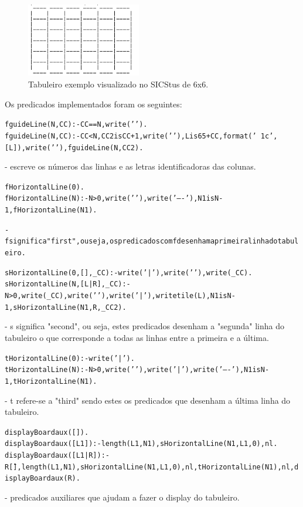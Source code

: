 \documentclass[a4paper]{article}
\begin{document}
\begin{figure}[h!]
\centering
\includegraphics[width=50mm]{board.jpg}
\caption{Tabuleiro exemplo visualizado no SICStus de 6x6. \label{board}}
\end{figure}

Os predicados implementados foram os seguintes:

\begin{alltt}
	fguideLine(N, CC) :- CC==N, write('    ').
	fguideLine(N, CC) :- CC < N, CC2 is CC+1, write('    '), \newline L is 65+CC, format('~1c', [L]) , write(' '), fguideLine(N, CC2).
\end{alltt}
		\normalfont - escreve os números das linhas e as letras identificadoras das colunas.
\begin{alltt}
	fHorizontalLine(0).
	fHorizontalLine(N) :- N>0 , write('  '), write('----'), N1 is N-1,\newline fHorizontalLine(N1).

		 \normalfont - f significa "first", ou seja, os predicados com f desenham a primeira linha do tabuleiro.
\end{alltt}
\begin{alltt}
	sHorizontalLine(0, [], \_CC) :- write('|'),write(' '), write(\_CC).
	sHorizontalLine(N, [L|R], \_CC) :- N>0 , write(\_CC), write(' '), \newline write('|'), writetile(L), N1 is N-1, sHorizontalLine(N1, R, \_CC2).
\end{alltt}
		\normalfont  - s significa "second", ou seja, estes predicados desenham a "segunda" linha do tabuleiro o que corresponde a todas as linhas entre a primeira e a última.

\begin{alltt}
	tHorizontalLine(0) :-  write('|').
	tHorizontalLine(N) :- N>0, write(' '), write('|'), \newline write('----'), N1 is N-1 , tHorizontalLine(N1).
\end{alltt}
		\normalfont - t refere-se a "third" sendo estes os predicados que desenham a última linha do tabuleiro.

\begin{alltt}
	displayBoardaux([]).
	displayBoardaux([L1]) :- length(L1,N1), sHorizontalLine(N1,L1,0), nl.
	displayBoardaux([L1|R]) :- R \= [], length(L1,N1),  \newline sHorizontalLine(N1, L1,0), nl, tHorizontalLine(N1), nl, displayBoardaux(R).
\end{alltt}
		\normalfont - predicados auxiliares que ajudam a fazer o display do tabuleiro.
\end{document}
